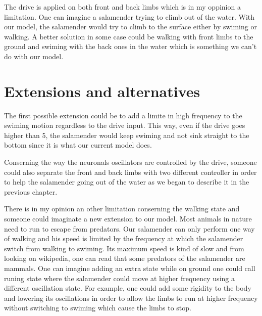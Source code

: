 \documentclass[a4paper]{scrartcl}
\begin{document}
The drive is applied on both front and back limbs which is in my oppinion a limitation. One can imagine a salamender trying to climb out of the water. With our model, the salamender would try to climb to the surface either by swiming or walking. A better solution in some case could be walking with front limbs to the ground and swiming with the back ones in the water which is something we can't do with our model. 


\section{Extensions and alternatives}

The first possible extension could be to add a limite in high frequency to the swiming motion regardless to the drive input. This way, even if the drive goes higher than 5, the salamender would keep swiming and not sink straight to the bottom since it is what our current model does.

Conserning the way the neuronals oscillators are controlled by the drive, someone could also separate the front and back limbs with two different controller in order to help the salamender going out of the water as we began to describe it in the previous chapter.

There is in my opinion an other limitation conserning the walking state and someone could imaginate a new extension to our model. Most animals in nature need to run to escape from predators. Our salamender can only perform one way of walking and his speed is limited by the frequency at which the salamender switch from walking to swiming. Its maximum speed is kind of slow and from looking on wikipedia, one can read that some predators of the salamender are mammals. One can imagine adding an extra state while on ground one could call runing state where the salamender could move at higher frequency using a different oscillation state. For example, one could add some rigidity to the body and lowering its oscillations in order to allow the limbs to run at higher frequency without switching to swiming which cause the limbs to stop.

\end{document}
